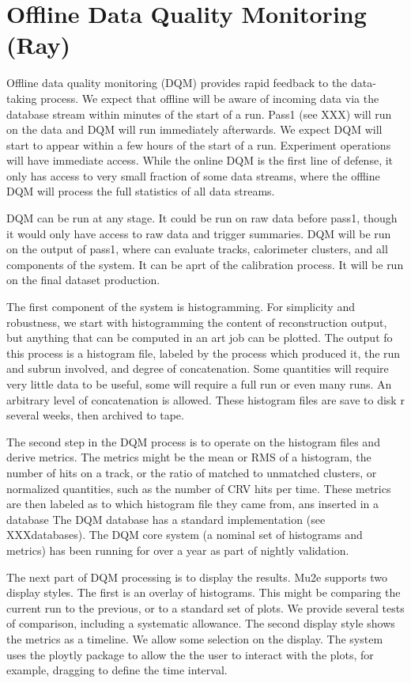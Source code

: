 \section{Offline Data Quality Monitoring (Ray)}
\label{sec:monitoring}

Offline data quality monitoring (DQM) provides rapid feedback to the data-taking process.  We expect that offline will be aware of incoming data via the database stream within minutes of the start of a run. Pass1 (see XXX) will run on the data and DQM will run immediately afterwards. We expect DQM will start to appear within a few hours of the start of a run.  Experiment operations will have immediate access.   While the online DQM is the first line of defense, it only has access to very small fraction of some data streams, where the offline DQM will process the full statistics of all data streams.

DQM can be run at any stage. It could be run on raw data before pass1, though it would only have access to raw data and trigger summaries.  DQM will be run on the output of pass1, where can evaluate tracks, calorimeter clusters, and all components of the system. It can be aprt of the calibration process.  It will be run on the final dataset production.

The first component of the system is histogramming.  For simplicity and robustness, we start with histogramming the content of reconstruction output, but anything that can be computed in an art job can be plotted.  The output fo this process is a histogram file, labeled by the process which produced it, the run and subrun involved, and degree of concatenation.  Some quantities will require very little data to be useful, some will require a full run or even many runs.  An arbitrary level of concatenation is allowed.  These histogram files are save to disk r several weeks, then archived to tape.

The second step in the DQM process is to operate on the histogram files and derive metrics.  The metrics might be the mean or RMS of a histogram, the number of hits on a track, or the ratio of matched to unmatched clusters, or normalized quantities, such as the number of CRV hits per time.  These metrics are then labeled as to which histogram file they came from, ans inserted in a database  The DQM database has a standard implementation (see XXXdatabases).  The DQM core system (a nominal set of histograms and metrics) has been running for over a year as part of nightly validation.

The next part of DQM processing is to display the results.  Mu2e supports two display styles. The first is an overlay of histograms.  This might be comparing the current run to the previous, or to a standard set of plots.  We provide several tests of comparison, including a systematic allowance.  The second display style shows the metrics as a timeline.  We allow some selection on the display. The system uses the ploytly package to allow the the user to interact with the plots, for example, dragging to define the time interval.

